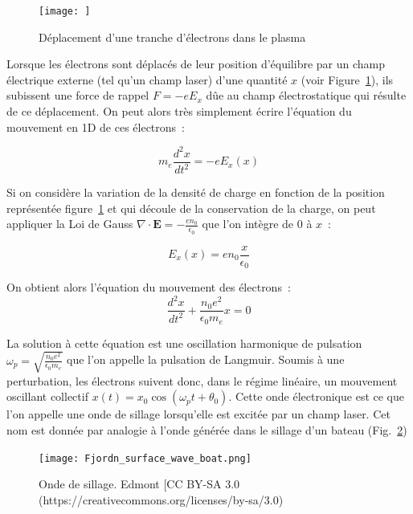 \documentclass[a4paper]{book}
\begin{document}
\begin{figure}[!htbp]
\begin{center}
\texttt{[image: ]}
\end{center}
\caption{Déplacement d'une tranche d'électrons dans le plasma}
\label{fig:osc_plas}
\end{figure}

Lorsque les électrons sont déplacés de leur position d'équilibre par un champ électrique externe (tel qu'un champ laser) d'une quantité $x$ (voir Figure~\ref{fig:osc_plas}), ils subissent une force de rappel $F=-e E_x$ dûe au champ électrostatique qui résulte de ce déplacement. On peut alors très simplement écrire l'équation du mouvement en 1D de ces électrons~: 

\begin{equation}
    m_e\frac{d^2 x}{dt^2}=-eE_x(x)
\end{equation}

Si on considère la variation de la densité de charge en fonction de la position représentée figure~\ref{fig:osc_plas} et qui découle de la conservation de la charge, on peut appliquer la Loi de Gauss $\nabla\cdot\textbf{E}=-\frac{e n_0}{\epsilon_0}$ que l'on intègre de 0 à $x$~: 

\begin{equation}
    E_x(x) = en_0\frac{x}{\epsilon_0}
    \label{eq:chp_E}
\end{equation}

On obtient alors l'équation du mouvement des électrons~:
\begin{equation}
    \frac{d^2x}{dt^2}+\frac{n_0e^2}{\epsilon_0 m_e} x =0
\end{equation}

La solution à cette équation est une oscillation harmonique de pulsation $\omega_p = \sqrt{\frac{n_0 e^2}{\epsilon_0 m_e}}$ que l'on appelle la pulsation de Langmuir. 
Soumis à une perturbation, les électrons suivent donc, dans le régime linéaire, un mouvement oscillant collectif $x(t) = x_0\cos(\omega_p t +\theta_0)$. 
Cette onde électronique est ce que l'on appelle une onde de sillage lorsqu'elle est excitée par un champ laser. Cet nom est donnée par analogie à l'onde générée dans le sillage d'un bateau (Fig.~\ref{fig:sillage})

\begin{figure}[!htbp]
\begin{center}
\texttt{[image: Fjordn\_surface\_wave\_boat.png]}
\end{center}
\caption{Onde de sillage. \textcopyleft Edmont [CC BY-SA 3.0 (https://creativecommons.org/licenses/by-sa/3.0) }
\label{fig:sillage}
\end{figure}
\end{document}
